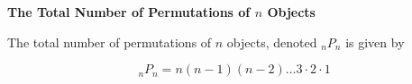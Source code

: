 {\bf The Total Number of Permutations of $n$ Objects}
\vskip 6pt

The total number of permutations of $n$ objects, denoted ${}_nP_n$ is given by

$${}_nP_n=n(n-1)(n-2)\ldots 3\cdot 2 \cdot 1$$

\vfill\eject
